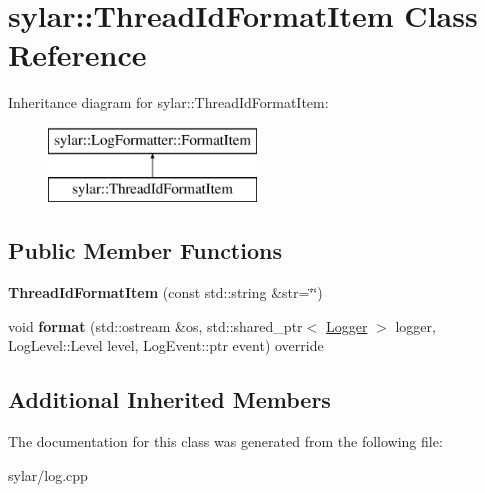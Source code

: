 \hypertarget{classsylar_1_1ThreadIdFormatItem}{\section{sylar\-:\-:Thread\-Id\-Format\-Item Class Reference}
\label{classsylar_1_1ThreadIdFormatItem}
}
Inheritance diagram for sylar\-:\-:Thread\-Id\-Format\-Item\-:\begin{figure}[H]
\begin{center}
\leavevmode
\includegraphics[height=2.000000cm]{classsylar_1_1ThreadIdFormatItem}
\end{center}
\end{figure}
\subsection*{Public Member Functions}
\begin{DoxyCompactItemize}
\item 
\hypertarget{classsylar_1_1ThreadIdFormatItem_af4c44d32c13a606f7c6afc69f694308a}{{\bfseries Thread\-Id\-Format\-Item} (const std\-::string \&str=\char`\"{}\char`\"{})}\label{classsylar_1_1ThreadIdFormatItem_af4c44d32c13a606f7c6afc69f694308a}

\item 
\hypertarget{classsylar_1_1ThreadIdFormatItem_a675cf164f54f261e7e58142ab068bf93}{void {\bfseries format} (std\-::ostream \&os, std\-::shared\-\_\-ptr$<$ \hyperlink{classsylar_1_1Logger}{Logger} $>$ logger, Log\-Level\-::\-Level level, Log\-Event\-::ptr event) override}\label{classsylar_1_1ThreadIdFormatItem_a675cf164f54f261e7e58142ab068bf93}

\end{DoxyCompactItemize}
\subsection*{Additional Inherited Members}


The documentation for this class was generated from the following file\-:\begin{DoxyCompactItemize}
\item 
sylar/log.\-cpp\end{DoxyCompactItemize}
